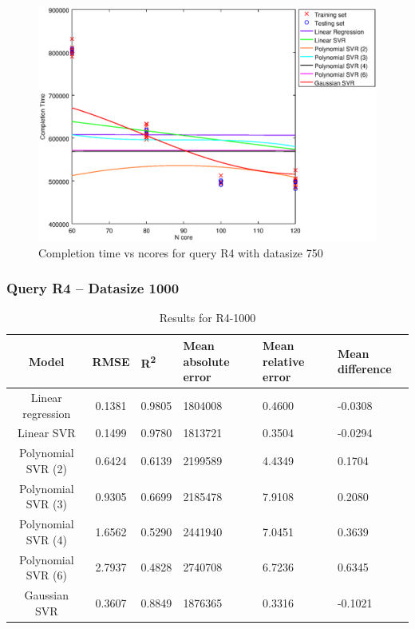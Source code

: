 \documentclass[a4paper,11pt]{article}
\begin{document}
\begin {figure}[hbtp]
\centering
\includegraphics[width=\textwidth]{output/R4_750_LINEAR_NCORE/plot_R4_750.eps}
\caption{Completion time vs ncores for query R4 with datasize 750}
\label{fig:all_linear_R4_750}
\end {figure}

\newpage
\subsubsection{Query R4 -- Datasize 1000}
\begin{table}[H]
	\centering
	\begin{adjustbox}{center}
		\begin{tabular}{c | c M{1.2cm} M{2.5cm} M{2.5cm} M{1.8cm}}
			Model & RMSE & R\textsuperscript{2} & Mean absolute error & Mean relative error & Mean difference \tabularnewline
			\hline
			Linear regression & 0.1381 & 0.9805 & 1804008 & 0.4600 & -0.0308 \\
			Linear SVR & 0.1499 & 0.9780 & 1813721 & 0.3504 & -0.0294 \\
			Polynomial SVR (2) & 0.6424 & 0.6139 & 2199589 & 4.4349 & 0.1704 \\
			Polynomial SVR (3) & 0.9305 & 0.6699 & 2185478 & 7.9108 & 0.2080 \\
			Polynomial SVR (4) & 1.6562 & 0.5290 & 2441940 & 7.0451 & 0.3639 \\
			Polynomial SVR (6) & 2.7937 & 0.4828 & 2740708 & 6.7236 & 0.6345 \\
			Gaussian SVR & 0.3607 & 0.8849 & 1876365 & 0.3316 & -0.1021 \\
		\end{tabular}
	\end{adjustbox}
	\\
	\caption{Results for R4-1000}
	\label{fig:all_linear_R4_1000}
\end{table}
\end{document}
